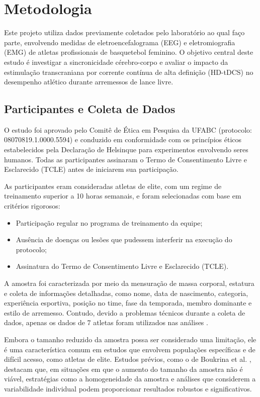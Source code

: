 \chapter{Metodologia}
\label{chap:metodologia}

Este projeto utiliza dados previamente coletados pelo laboratório ao qual faço parte, envolvendo medidas de eletroencefalograma (EEG) e eletromiografia (EMG) de atletas profissionais de basquetebol feminino. O objetivo central deste estudo é investigar a sincronicidade cérebro-corpo e avaliar o impacto da estimulação transcraniana por corrente contínua de alta definição (HD-tDCS) no desempenho atlético durante arremessos de lance livre.

\section{Participantes e Coleta de Dados}

O estudo foi aprovado pelo Comitê de Ética em Pesquisa da UFABC (protocolo: 08070819.1.0000.5594) e conduzido em conformidade com os princípios éticos estabelecidos pela Declaração de Helsinque para experimentos envolvendo seres humanos. Todas as participantes assinaram o Termo de Consentimento Livre e Esclarecido (TCLE) antes de iniciarem sua participação.

As participantes eram consideradas atletas de elite, com um regime de treinamento superior a 10 horas semanais, e foram selecionadas com base em critérios rigorosos:
\begin{itemize}
    \item Participação regular no programa de treinamento da equipe;
    \item Ausência de doenças ou lesões que pudessem interferir na execução do protocolo;
    \item Assinatura do Termo de Consentimento Livre e Esclarecido (TCLE).
\end{itemize}

A amostra foi caracterizada por meio da mensuração de massa corporal, estatura e coleta de informações detalhadas, como nome, data de nascimento, categoria, experiência esportiva, posição no time, fase da temporada, membro dominante e estilo de arremesso. Contudo, devido a problemas técnicos durante a coleta de dados, apenas os dados de 7 atletas foram utilizados nas análises \cite{moscaleski2022hdtdcs}.

Embora o tamanho reduzido da amostra possa ser considerado uma limitação, ele é uma característica comum em estudos que envolvem populações específicas e de difícil acesso, como atletas de elite. Estudos prévios, como o de Boukrina et al. \cite{boukrina2020considerations}, destacam que, em situações em que o aumento do tamanho da amostra não é viável, estratégias como a homogeneidade da amostra e análises que considerem a variabilidade individual podem proporcionar resultados robustos e significativos.

